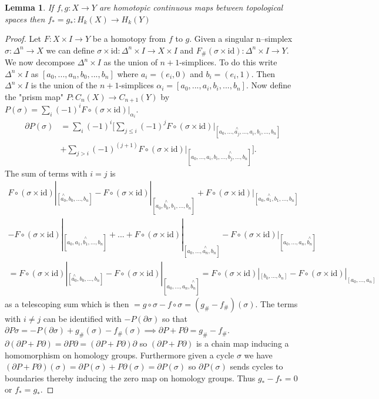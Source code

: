 \documentclass{article}
\newtheorem{lemma}[theorem]{Lemma}
\begin{document}
\begin{lemma}
If $f,g\colon X\to Y$ are homotopic continuous maps between topological spaces then $f_*=g_*\colon H_k(X)\to H_k(Y)$
\end{lemma}
\begin{proof}
Let $F\colon X\times I\to Y$ be a homotopy from $f$ to $g$. Given a singular n--simplex $\sigma\colon\Delta^n\to X$ we can define $\sigma\times\text{id}\colon\Delta^n\times I\to X\times I$ and $F_\#(\sigma\times\text{id})\colon\Delta^n\times I\to Y$. We now decompose $\Delta^n\times I$ as the union of $n+1$-simplices. To do this write $\Delta^n\times I$ as $[a_0,...,a_n,b_0,...,b_n]$ where $a_i=(e_i,0)$ and $b_i=(e_i,1)$. Then $\Delta^n\times I$ is the union of the $n+1$-simplices $\alpha_i=[a_0,...,a_i,b_i,...,b_n]$. Now define the "prism map" $P\colon C_n(X)\to C_{n+1}(Y)$ by $P(\sigma)=\sum_i(-1)^iF\circ(\sigma\times\text{id})|_{\alpha_i}$. 
\begin{align*}
\partial P(\sigma)&=\sum_i(-1)^i[\sum_{j\leq i}(-1)^jF\circ(\sigma\times\text{id})|_{[a_0,...,\overset{\wedge}{a_j},...,a_i,b_i,...,b_n]}\\&+\sum_{j> i}(-1)^{(j+1)}F\circ(\sigma\times\text{id})|_{[a_0,...,a_i,b_i,...,\overset{\wedge}{b_j},...,b_n]}].
\end{align*}
The sum of terms with $i=j$ is 
\begin{multline*}
F\circ(\sigma\times\text{id})|_{[\overset{\wedge}{a_0},b_0,...,b_n]}-F\circ(\sigma\times\text{id})|_{[a_0,\overset{\wedge}{b_0},b_1,...,b_n]}+F\circ(\sigma\times\text{id})|_{[a_0,\overset{\wedge}{a_1},b_1,...,b_n]}\\-F\circ(\sigma\times\text{id})|_{[a_0,a_1,\overset{\wedge}{b_1},...,b_n]}+...+F\circ(\sigma\times\text{id})|_{[a_0,...,\overset{\wedge}{a_n},b_n]}-F\circ(\sigma\times\text{id})|_{[a_0,...,a_n,\overset{\wedge}{b_n}]}\\=F\circ(\sigma\times\text{id})|_{[\overset{\wedge}{a_0},b_0,...,b_n]}-F\circ(\sigma\times\text{id})|_{[a_0,...,a_n,\overset{\wedge}{b_n}]}=F\circ(\sigma\times\text{id})|_{[b_0,...,b_n]}-F\circ(\sigma\times\text{id})|_{[a_0,...,a_n]}
\end{multline*}as a telescoping sum which is then $=g\circ\sigma-f\circ\sigma=(g_\#-f_\#)(\sigma)$. The terms with $i\neq j$ can be identified with $-P(\partial\sigma)$ so that $\partial P\sigma=-P(\partial\sigma)+g_\#(\sigma)-f_\#(\sigma)\implies\partial P + P\partial=g_\#-f_\#$. $\partial(\partial P + P\partial)=\partial P\partial=(\partial P + P\partial)\partial$ so $(\partial P + P\partial)$ is a chain map inducing a homomorphism on homology groups. Furthermore given a cycle $\sigma$ we have $(\partial P + P\partial)(\sigma)=\partial P(\sigma) + P\partial(\sigma)=\partial P(\sigma)$ so $\partial P(\sigma)$ sends cycles to boundaries thereby inducing the zero map on homology groups. Thus $g_*-f_*=0$ or $f_*=g_*$.
\end{proof}
\end{document}
